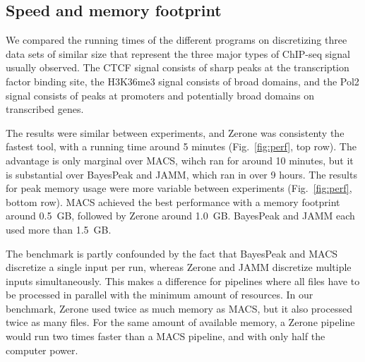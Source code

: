 \documentclass{bioinfo}
\begin{document}
\subsection{Speed and memory footprint}
We compared the running times of the different programs on discretizing
three data sets of similar size that represent the three major types of
ChIP-seq signal usually observed. The CTCF signal consists of sharp
peaks at the transcription factor binding site, the H3K36me3 signal
consists of broad domains, and the Pol2 signal consists of  peaks
at promoters and potentially broad domains on transcribed genes.

The results were similar between experiments, and Zerone was
consistenty the fastest tool, with a running time around 5 minutes
(Fig.~\ref{fig:perf}, top row). The advantage is only marginal over
MACS, wihch ran for around 10 minutes, but it is substantial over
BayesPeak and JAMM, which ran in over 9 hours. The results for peak
memory usage were more variable between experiments (Fig.~\ref{fig:perf},
bottom row). MACS achieved the best performance with a memory
footprint around 0.5~GB, followed by Zerone around 1.0~GB.
BayesPeak and JAMM each used more than 1.5~GB.

The benchmark is partly confounded by the fact that BayesPeak and MACS
discretize a single input per run, whereas Zerone and JAMM discretize
multiple inputs simultaneously. This makes a difference for pipelines
where all files have to be processed in parallel with the minimum
amount of resources. In our benchmark, Zerone used twice as much memory
as MACS, but it also processed twice as many files. For the same amount
of available memory, a Zerone pipeline would run two times faster than a
MACS pipeline, and with only half the computer power.
\end{document}
